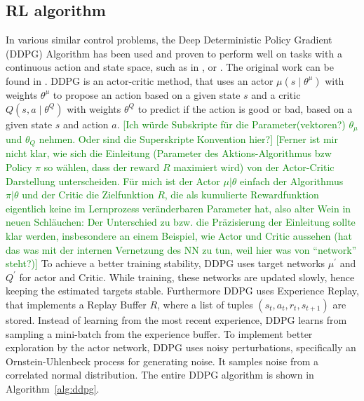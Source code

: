 \documentclass[review]{elsarticle}
\providecommand{\green}[1]{\textcolor{green}{#1}}
\providecommand{\martinc}[1]{\green{[#1]}} %
\providecommand{\3}{{\ss}}
\begin{document}
  \subsection{\label{RL-algorithm}RL algorithm}
  In various similar control problems, the Deep Deterministic Policy
  Gradient (DDPG) Algorithm has been used and proven to perform well on
  tasks with a continuous action and state space, such as in
  \cite{SafeEfficientAndComfortable}, \cite{ComparisonRLvsMPC} or
  \cite{HumanLikeAutonomouCF}. The original work can be found in
  \cite{DDPG}. DDPG is an actor-critic method, that uses an actor
  $\mu\left(s \mid \theta^{\mu}\right)$ with weights $\theta^{\mu} $
  to propose an action based on a given state $s$ and a critic
  $Q\left(s, a \mid \theta^{Q}\right) $ with weights  $\theta^{Q}$ to
  predict if the action is good or bad, based on a given state $s$ and
  action $a$. \martinc{Ich w\"urde Subskripte f\"ur die Parameter(vektoren?)
  $\theta_{\mu}$ und $\theta_Q$ nehmen. Oder sind die Superskripte
    Konvention hier?}
\martinc{Ferner ist mir nicht klar, wie sich die
    Einleitung (Parameter des Aktions-Algorithmus bzw  Policy $\pi$ so w\"ahlen, dass der reward $R$
    maximiert wird) von der
    Actor-Critic Darstellung unterscheiden. F\"ur mich ist der Actor
    $\mu|\theta$ einfach der Algorithmus $\pi|\theta$ und der Critic die
    Zielfunktion $R$, die als kumulierte Rewardfunktion eigentlich keine im Lernprozess
    ver\"anderbaren Parameter hat, also alter Wein in neuen
    Schl\"auchen: Der Unterschied zu bzw. die Pr\"azisierung der
    Einleitung sollte klar werden, insbesondere an einem Beispiel, wie
Actor und Critic aussehen (hat das was mit der internen Vernetzung des
NN zu tun, weil hier was von ``network'' steht?)} 
To achieve a better training stability, DDPG uses target networks  $\mu^{\prime}$ and $Q^{\prime}$ for actor and Critic. While training, these networks are updated slowly, hence keeping the estimated targets stable. Furthermore DDPG uses Experience Replay, that implements a Replay Buffer $R$, where a list of tuples $\left(s_{t}, a_{t}, r_{t}, s_{t+1}\right)$ are stored. Instead of learning from the most recent experience, DDPG learns from sampling a mini-batch from the experience buffer. To implement better exploration by the actor network, DDPG uses noisy perturbations, specifically an Ornstein-Uhlenbeck process for generating noise. It samples noise from a correlated normal distribution. The entire DDPG algorithm is shown in Algorithm~\ref{alg:ddpg}. 
  
\end{document}
